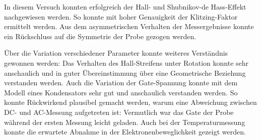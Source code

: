 
In diesem Versuch konnten erfolgreich der Hall- und Shubnikov-de Hass-Effekt nachgewiesen werden. So konnte mit hoher Genauigkeit der Klitzing-Faktor ermittelt werden. Aus dem asymmetrischen Verhalten der Messergebnisse konnte ein Rückschluss auf die Symmetrie der Probe gezogen werden.

Über die Variation verschiedener Parameter konnte weiteres Verständnis gewonnen werden: Das Verhalten des Hall-Streifens unter Rotation konnte sehr anschaulich und in guter Übereinstimmung über eine Geometrische Beziehung verstanden werden. Auch die Variation der Gate-Spannung konnte mit dem Modell eines Kondensators sehr gut und anschaulich verstanden werden. So konnte Rückwirkend plausibel gemacht werden, warum eine Abweichung zwischen DC- und AC-Messung aufgetreten ist: Vermutlich war das Gate der Probe während der ersten Messung leicht geladen. Auch bei der Temperaturmessung konnte die erwartete Abnahme in der Elektronenbeweglichkeit gezeigt werden.